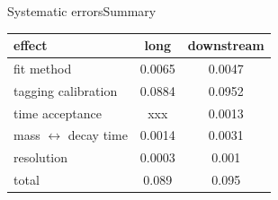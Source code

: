 \documentclass{beamer}
\begin{document}
\begin{frame}{Systematic errors}{Summary}
\begin{center}
\begin{tabular}{l c c}
\hline \hline
effect & long & downstream \\ \hline
fit  method & 0.0065 & 0.0047\\
tagging calibration & 0.0884 & 0.0952\\
time acceptance & xxx & 0.0013\\
mass $\leftrightarrow$ decay time & 0.0014 & 0.0031 \\
resolution & 0.0003 & 0.001 \\ \hline
total & 0.089 & 0.095 \\
\hline \hline
\end{tabular}
\end{center}
\end{frame}
\end{document}
